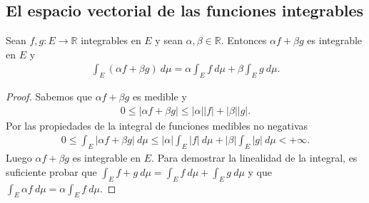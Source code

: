 \subsection{El espacio vectorial de las funciones integrables}

\begin{prop}
    Sean $f,g: E \longrightarrow \mathbb{R}$ integrables en $E$ y sean $\alpha,\beta \in \mathbb{R}$. Entonces $\alpha f + \beta g$ es integrable en $E$ y
    \begin{align*}
        \int_{E}{(\alpha f + \beta g) \ d\mu} = \alpha\int_{E}{f \ d\mu} + \beta\int_{E}{g \ d\mu}.
    \end{align*}
\end{prop}

\begin{proof}
    Sabemos que $\alpha f + \beta g$ es medible y
    \begin{align*}
        0 \leq |\alpha f + \beta g| \leq |\alpha||f| + |\beta||g|.
    \end{align*}
    Por las propiedades de la integral de funciones medibles no negativas
    \begin{align*}
        0 \leq \int_{E}{|\alpha f + \beta g| \ d\mu} \leq |\alpha|\int_{E}{|f| \ d\mu} + |\beta|\int_{E}{|g| \ d\mu} < +\infty.
    \end{align*}
    Luego $\alpha f + \beta g$ es integrable en $E$. Para demostrar la linealidad de la integral, es suficiente probar que $\int_{E}{f + g \ d\mu} = \int_{E}{f \ d\mu} + \int_{E}{g \ d\mu}$ y que $\int_{E}{\alpha f \ d\mu} = \alpha\int_{E}{f \ d\mu}$.


\end{proof}

